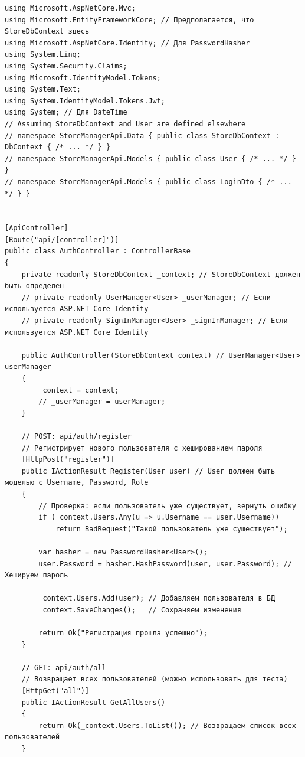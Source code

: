 \documentclass[12pt]{article}
\newenvironment{code}
  {\par\captionsetup{type=listing}\noindent}
  {\par\vspace{\baselineskip}}
\numberwithin{listing}{section}
\numberwithin{figure}{section}
\begin{document}
\begin{code}
	\begin{verbatim}
using Microsoft.AspNetCore.Mvc;
using Microsoft.EntityFrameworkCore; // Предполагается, что StoreDbContext здесь
using Microsoft.AspNetCore.Identity; // Для PasswordHasher
using System.Linq;
using System.Security.Claims;
using Microsoft.IdentityModel.Tokens;
using System.Text;
using System.IdentityModel.Tokens.Jwt;
using System; // Для DateTime
// Assuming StoreDbContext and User are defined elsewhere
// namespace StoreManagerApi.Data { public class StoreDbContext : DbContext { /* ... */ } }
// namespace StoreManagerApi.Models { public class User { /* ... */ } }
// namespace StoreManagerApi.Models { public class LoginDto { /* ... */ } }


[ApiController]
[Route("api/[controller]")]
public class AuthController : ControllerBase
{
    private readonly StoreDbContext _context; // StoreDbContext должен быть определен
    // private readonly UserManager<User> _userManager; // Если используется ASP.NET Core Identity
    // private readonly SignInManager<User> _signInManager; // Если используется ASP.NET Core Identity

    public AuthController(StoreDbContext context) // UserManager<User> userManager
    {
        _context = context;
        // _userManager = userManager;
    }

    // POST: api/auth/register
    // Регистрирует нового пользователя с хешированием пароля
    [HttpPost("register")]
    public IActionResult Register(User user) // User должен быть моделью с Username, Password, Role
    {
        // Проверка: если пользователь уже существует, вернуть ошибку
        if (_context.Users.Any(u => u.Username == user.Username))
            return BadRequest("Такой пользователь уже существует");

        var hasher = new PasswordHasher<User>();
        user.Password = hasher.HashPassword(user, user.Password); // Хешируем пароль

        _context.Users.Add(user); // Добавляем пользователя в БД
        _context.SaveChanges();   // Сохраняем изменения

        return Ok("Регистрация прошла успешно");
    }

    // GET: api/auth/all
    // Возвращает всех пользователей (можно использовать для теста)
    [HttpGet("all")]
    public IActionResult GetAllUsers()
    {
        return Ok(_context.Users.ToList()); // Возвращаем список всех пользователей
    }


\end{verbatim}
\end{code}
\end{document}
